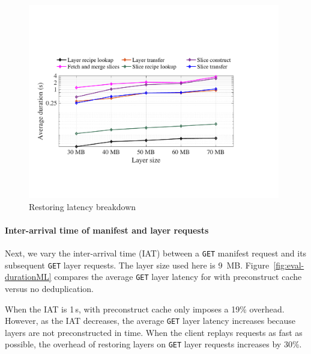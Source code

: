\begin{figure}[t]
\begin{minipage}{0.3\textwidth}
	\includegraphics[width=0.98\textwidth]{graphs/restoringbreakdown.pdf}
	\caption{Restoring latency breakdown}
	\label{fig:eval-restoringbreakdown}
	\end{minipage}
\end{figure}
 
\paragraph{Inter-arrival time of manifest and layer requests}
%
Next, we vary the inter-arrival time (IAT) between a \texttt{GET} manifest request and its
subsequent \texttt{GET} layer requests.
%
The layer size used here is 9~MB.
%
Figure~\ref{fig:eval-durationML} compares the average \texttt{GET} layer latency for
\sysname with preconstruct cache versus no deduplication.

When the IAT is 1\,s, \sysname with preconstruct cache only imposes a 19\% overhead.
%
However, as the IAT decreases, the average \texttt{GET} layer latency increases because
layers are not preconstructed in time.
%
When the client replays requests as fast as possible, the overhead of restoring layers on
\texttt{GET} layer requests increases by 30\%.
%

